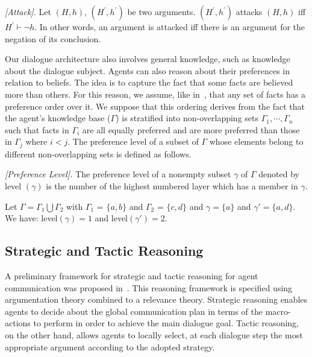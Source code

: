 \begin{definition}{\emph{[Attack].}} \label{Attack}
Let $(H, h)$, $(H^{\prime}, h^{\prime})$ be two arguments. $(H^{\prime}, h^{\prime})$ attacks $(H, h)$ iff $H^{\prime} \vdash
\neg h$. In other words, an argument is attacked iff there is an argument for the negation of its conclusion.
\end{definition}

Our dialogue architecture also involves general knowledge, such as knowledge about the dialogue subject. Agents can also reason about
their preferences in relation to beliefs. The idea is to capture the fact that some facts are believed more than others. For this
reason, we assume, like in~\cite{Mbarki06}, that any set of facts has a preference order over it. We suppose that this ordering
derives from the fact that the agent's knowledge base ($\Gamma$) is stratified into non-overlapping sets $\Gamma_1,\cdots ,
\Gamma_n$ such that facts in $\Gamma_i$ are all equally preferred and are more preferred than those in $\Gamma_j$ where $i < j$. The
preference level of a subset of $\Gamma$ whose elements belong to different non-overlapping sets is defined as follows.

\begin{definition}{\emph{[Preference Level].}} \label{preferenceLevel}
The preference level of a nonempty subset $\gamma$ of $\Gamma$ denoted by level $(\gamma)$ is the number of the highest numbered
layer which has a member in $\gamma$.
\end{definition}
\begin{example}
Let $\Gamma = \Gamma_1 \bigcup \Gamma_2 $ with $\Gamma_1$ = $\{ a, b\}$ and $\Gamma_2$ = $\{ c,d \}$ and $\gamma = \{a\}$ and
$\gamma\prime = \{a,d\}$. We have: level$(\gamma) = 1$ and level$(\gamma\prime) = 2$.
\end{example}

\subsection{Strategic and Tactic Reasoning}\label{sec:reasoning}
A preliminary framework for strategic and tactic reasoning for agent communication was proposed in~\cite{Mbarki06}. This
reasoning framework is specified using argumentation theory combined to a relevance theory. Strategic reasoning enables agents
to decide about the global communication plan in terms of the macro-actions to perform in order to achieve the main dialogue
goal. Tactic reasoning, on the other hand, allows agents to locally select, at each dialogue step the most appropriate
argument according to the adopted strategy.

